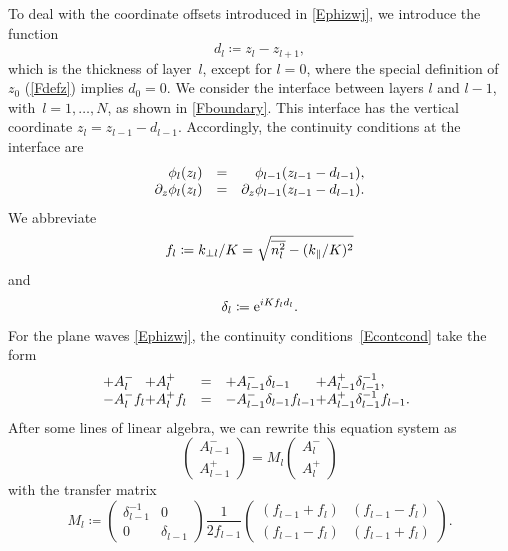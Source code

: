 To deal with the coordinate offsets introduced in \cref{Ephizwj},
we introduce the function%
\begin{equation}\label{Edldef}
  d_l\coloneqq z_l-z_{l+1},
\end{equation}
which is the thickness of layer~$l$,
except for $l=0$,
where the special definition of $z_0$ (\cref{Fdefz}) implies $d_0=0$.
We consider the interface between layers $l$ and $l-1$,
with~$l=1,\ldots,N$, as shown in \cref{Fboundary}.
This interface has the vertical coordinate $z_l=z_{l-1}-d_{l-1}$.
Accordingly, the continuity conditions at the interface are
\begin{equation}\label{Econtcond}
  \begin{array}{lcl}
 \hphantom{\partial_z}\phi_l(z_l) &=& \hphantom{\partial_z}\phi_{l-1}(z_{l-1}-d_{l-1}),\\
           \partial_z \phi_l(z_l) &=&           \partial_z \phi_{l-1}(z_{l-1}-d_{l-1}).
  \end{array}
\end{equation}
We abbreviate
\begin{equation}\label{Efldef}
  f_l \coloneqq  k_{\perp l}/K = \sqrt{\overline{n_l^2}-(k_\parallel/K)^2}
\end{equation}
and
\begin{equation}\label{Edelldef}
   \delta_l \coloneqq  \mathrm e^{iKf_l d_l}.
\end{equation}
For the plane waves \cref{Ephizwj},
the continuity conditions~\cref{Econtcond} take the form
\begin{equation}\label{Econt2}
  \begin{array}{@{}l@{}lcl@{}l}
  +A^-_l &+A^+_l
  &=&
  +A^-_{l-1}\delta_{l-1} &+A^+_{l-1}\delta_{l-1}^{-1},
  \\
  -A^-_l f_l  &+A^+_l f_l
  &=&
  -A^-_{l-1}\delta_{l-1} f_{l-1} &+A^+_{l-1}\delta_{l-1}^{-1} f_{l-1}.
  \end{array}
\end{equation}
After some lines of linear algebra,
we can rewrite this equation system as
\begin{equation}\label{EcMc}
  \left( \begin{array}{c}A^-_{l-1}\\ A^+_{l-1}\end{array} \right)
  = M_l \left( \begin{array}{c}A^-_l\\A^+_l\end{array} \right)
\end{equation}
with the transfer matrix
\begin{equation}\label{EMil}
  M_l
   \coloneqq
   \left(\begin{array}{cc}
     \delta_{l-1}^{-1}&0\\
       0 & \delta_{l-1}
   \end{array}\right)
   \frac{1}{2f_{l-1}}
   \left(\begin{array}{cc}
       (f_{l-1}+f_l)&(f_{l-1}-f_l)\\
       (f_{l-1}-f_l)&(f_{l-1}+f_l)
   \end{array}\right).
\end{equation}

